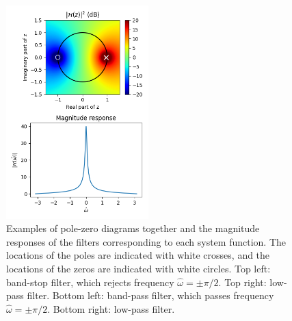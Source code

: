 \begin{figure}
\begin{center}
            \includegraphics[width=0.49\textwidth]{code/026_iir/ex4.png}
        \end{center}
        \caption{Examples of pole-zero diagrams together and the magnitude responses of the filters
            corresponding to each system function. The locations of the poles are indicated with white crosses,
            and the locations of the zeros are indicated with white circles.
            Top left: band-stop filter, which rejects frequency $\hat{\omega}=\pm\pi/2$.
            Top right: low-pass filter.
            Bottom left: band-pass filter, which passes frequency $\hat{\omega}=\pm \pi/2$.
            Bottom right: low-pass filter.}
        \label{fig:pz_examples}
    \end{figure}

